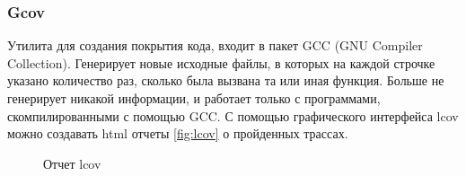 \subsubsection{Gcov}\label{sec:ch1/sec3/sub2/sub1}
Утилита для создания покрытия кода, входит в пакет GCC (GNU Compiler Collection).
Генерирует новые исходные файлы, в которых на каждой строчке указано количество
раз, сколько была вызвана та или иная функция. Больше не генерирует никакой информации,
и работает только с программами, скомпилированными с помощью GCC. 
С помощью графического интерфейса lcov можно создавать html отчеты \autoref{fig:lcov} о
пройденных трассах.

\begin{figure}[!htbp]
    \caption{Отчет lcov\label{fig:lcov}}
\end{figure}

